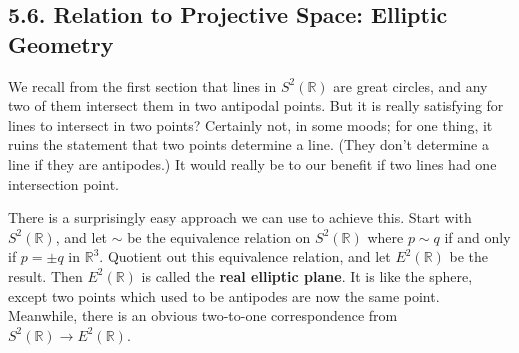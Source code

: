\documentclass[leqno]{book}
\begin{document}
\subsection*{5.6. Relation to Projective Space: Elliptic Geometry}
We recall from the first section that lines in $S^2(\mathbb R)$ are great circles, and any two of them intersect them in two antipodal points.  But it is really satisfying for lines to intersect in two points?  Certainly not, in some moods; for one thing, it ruins the statement that two points determine a line.  (They don't determine a line if they are antipodes.)  It would really be to our benefit if two lines had one intersection point.

There is a surprisingly easy approach we can use to achieve this.  Start with $S^2(\mathbb R)$, and let $\sim$ be the equivalence relation on $S^2(\mathbb R)$ where $p\sim q$ if and only if $p=\pm q$ in $\mathbb R^3$.  Quotient out this equivalence relation, and let $E^2(\mathbb R)$ be the result.  Then $E^2(\mathbb R)$ is called the \textbf{real elliptic plane}.  It is like the sphere, except two points which used to be antipodes are now the same point.  Meanwhile, there is an obvious two-to-one correspondence from $S^2(\mathbb R)\to E^2(\mathbb R)$.
\end{document}
